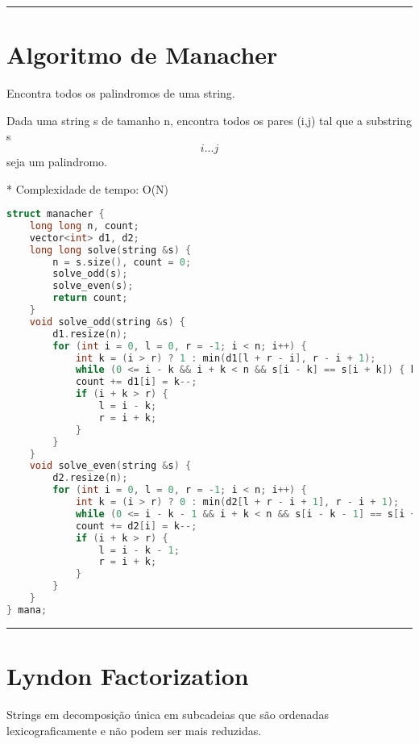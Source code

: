 \documentclass[11pt, a4paper, twoside]{book}
\begin{document}
\hfill

\rule{\textwidth}{0.4pt}

\section{Algoritmo de Manacher}



Encontra todos os palindromos de uma string.



Dada uma string s de tamanho n, encontra todos os pares (i,j) tal que a substring s\[i...j\] seja um palindromo.



* Complexidade de tempo: O(N)


\hfill

\begin{lstlisting}[language=C++]
struct manacher {
    long long n, count;
    vector<int> d1, d2;
    long long solve(string &s) {
        n = s.size(), count = 0;
        solve_odd(s);
        solve_even(s);
        return count;
    }
    void solve_odd(string &s) {
        d1.resize(n);
        for (int i = 0, l = 0, r = -1; i < n; i++) {
            int k = (i > r) ? 1 : min(d1[l + r - i], r - i + 1);
            while (0 <= i - k && i + k < n && s[i - k] == s[i + k]) { k++; }
            count += d1[i] = k--;
            if (i + k > r) {
                l = i - k;
                r = i + k;
            }
        }
    }
    void solve_even(string &s) {
        d2.resize(n);
        for (int i = 0, l = 0, r = -1; i < n; i++) {
            int k = (i > r) ? 0 : min(d2[l + r - i + 1], r - i + 1);
            while (0 <= i - k - 1 && i + k < n && s[i - k - 1] == s[i + k]) { k++; }
            count += d2[i] = k--;
            if (i + k > r) {
                l = i - k - 1;
                r = i + k;
            }
        }
    }
} mana;
\end{lstlisting}

\hfill

\rule{\textwidth}{0.4pt}

\section{Lyndon Factorization}



Strings em decomposição única em subcadeias que são ordenadas lexicograficamente e não podem ser mais reduzidas.
\end{document}
